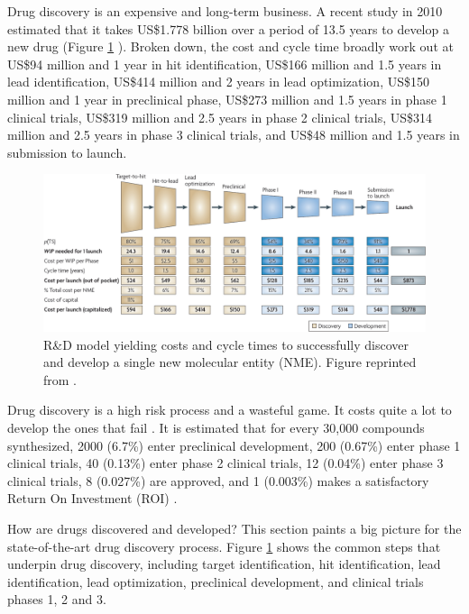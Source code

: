 Drug discovery is an expensive and long-term business. A recent study in 2010 estimated that it takes US\$1.778 billion over a period of 13.5 years to develop a new drug (Figure \ref{fig:DrugDiscoveryProcess} \citep{716}). Broken down, the cost and cycle time broadly work out at US\$94 million and 1 year in hit identification, US\$166 million and 1.5 years in lead identification, US\$414 million and 2 years in lead optimization, US\$150 million and 1 year in preclinical phase, US\$273 million and 1.5 years in phase 1 clinical trials, US\$319 million and 2.5 years in phase 2 clinical trials, US\$314 million and 2.5 years in phase 3 clinical trials, and US\$48 million and 1.5 years in submission to launch.

\begin{figure}
\centering
\includegraphics[width=\textwidth]{Background/DrugDiscoveryProcess.png}
\caption{R\&D model yielding costs and cycle times to successfully discover and develop a single new molecular entity (NME). Figure reprinted from \citep{716}.}
\label{fig:DrugDiscoveryProcess}
\end{figure}


Drug discovery is a high risk process and a wasteful game. It costs quite a lot to develop the ones that fail \citep{688}. It is estimated that for every 30,000 compounds synthesized, 2000 (6.7\%) enter preclinical development, 200 (0.67\%) enter phase 1 clinical trials, 40 (0.13\%) enter phase 2 clinical trials, 12 (0.04\%) enter phase 3 clinical trials, 8 (0.027\%) are approved, and 1 (0.003\%) makes a satisfactory Return On Investment (ROI) \citep{713}.

How are drugs discovered and developed? This section paints a big picture for the state-of-the-art drug discovery process. Figure \ref{fig:DrugDiscoveryProcess} \citep{716} shows the common steps that underpin drug discovery, including target identification, hit identification, lead identification, lead optimization, preclinical development, and clinical trials phases 1, 2 and 3.

